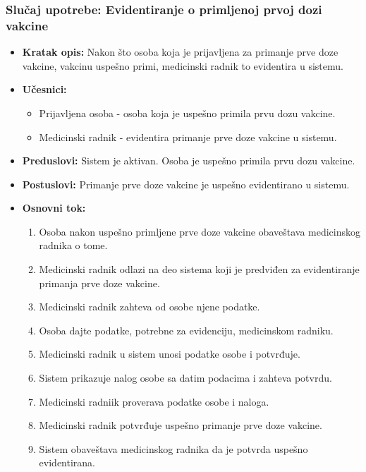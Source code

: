 \documentclass[titlepage]{article}
\begin{document}
\subsubsection{Slučaj upotrebe: Evidentiranje o primljenoj prvoj dozi vakcine}
\begin{itemize}
    \item \textbf{Kratak opis:} Nakon što osoba koja je prijavljena za primanje prve doze vakcine, vakcinu uspešno primi, medicinski radnik to evidentira u sistemu.
    \item \textbf{Učesnici:}
        \begin{itemize}
            \item Prijavljena osoba - osoba koja je uspešno primila prvu dozu vakcine.
	    \item Medicinski radnik - evidentira primanje prve doze vakcine u sistemu.
        \end{itemize}
    \item \textbf{Preduslovi:} Sistem je aktivan. Osoba je uspešno primila prvu dozu vakcine.
    \item \textbf{Postuslovi:} Primanje prve doze vakcine je uspešno evidentirano u sistemu.
    \item \textbf{Osnovni tok:}
        \begin{enumerate}
	    \item Osoba nakon uspešno primljene prve doze vakcine obaveštava medicinskog radnika o tome.
	    \item Medicinski radnik odlazi na deo sistema koji je predviđen za evidentiranje primanja prve doze vakcine.
            \item Medicinski radnik zahteva od osobe njene podatke.
	    \item Osoba dajte podatke, potrebne za evidenciju, medicinskom radniku.
	    \item Medicinski radnik u sistem unosi podatke osobe i potvrđuje.
	    \item Sistem prikazuje nalog osobe sa datim podacima i zahteva potvrdu.
	    \item Medicinski radniik proverava podatke osobe i naloga.
	    \item Medicinski radnik potvrđuje uspešno primanje prve doze vakcine.
	    \item Sistem obaveštava medicinskog radnika da je potvrda uspešno evidentirana.
	\end{enumerate}
     
    

\end{itemize}
\end{document}
